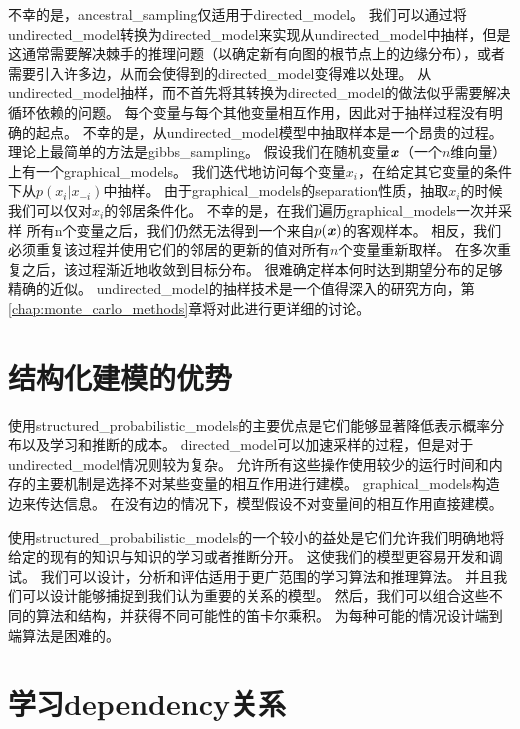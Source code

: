 不幸的是，\gls{ancestral_sampling}仅适用于\gls{directed_model}。 
我们可以通过将\gls{undirected_model}转换为\gls{directed_model}来实现从\gls{undirected_model}中抽样，但是这通常需要解决棘手的推理问题（以确定新有向图的根节点上的边缘分布），或者需要引入许多边，从而会使得到的\gls{directed_model}变得难以处理。
从\gls{undirected_model}抽样，而不首先将其转换为\gls{directed_model}的做法似乎需要解决循环依赖的问题。 
每个变量与每个其他变量相互作用，因此对于抽样过程没有明确的起点。
不幸的是，从\gls{undirected_model}模型中抽取样本是一个昂贵的过程。
理论上最简单的方法是\gls{gibbs_sampling}。
假设我们在随机变量$\boldsymbol{\mathit{x}}$（一个$n$维向量）上有一个\gls{graphical_models}。 
我们迭代地访问每个变量$x_i$，在给定其它变量的条件下从$p(x_i \vert x_{-i})$中抽样。
由于\gls{graphical_models}的\gls{separation}性质，抽取$x_i$的时候我们可以仅对$x_i$的邻居条件化。
不幸的是，在我们遍历\gls{graphical_models}一次并采样 所有n个变量之后，我们仍然无法得到一个来自$p(\boldsymbol{\mathit{x}})$的客观样本。
相反，我们必须重复该过程并使用它们的邻居的更新的值对所有$n$个变量重新取样。
在多次重复之后，该过程渐近地收敛到目标分布。
很难确定样本何时达到期望分布的足够精确的近似。
\gls{undirected_model}的抽样技术是一个值得深入的研究方向，第\ref{chap:monte_carlo_methods}章将对此进行更详细的讨论。




\section{结构化建模的优势}
\label{sec:advantages_of_structured_modelling}


使用\gls{structured_probabilistic_models}的主要优点是它们能够显著降低表示概率分布以及学习和推断的成本。
\gls{directed_model}可以加速采样的过程，但是对于\gls{undirected_model}情况则较为复杂。
允许所有这些操作使用较少的运行时间和内存的主要机制是选择不对某些变量的相互作用进行建模。
\gls{graphical_models}构造边来传达信息。
在没有边的情况下，模型假设不对变量间的相互作用直接建模。


使用\gls{structured_probabilistic_models}的一个较小的益处是它们允许我们明确地将给定的现有的知识与知识的学习或者推断分开。
这使我们的模型更容易开发和调试。 
我们可以设计，分析和评估适用于更广范围的学习算法和推理算法。
并且我们可以设计能够捕捉到我们认为重要的关系的模型。
然后，我们可以组合这些不同的算法和结构，并获得不同可能性的笛卡尔乘积。
为每种可能的情况设计端到端算法是困难的。



\section{学习\gls{dependency}关系}
\label{sec:learning_about_dependencies}

